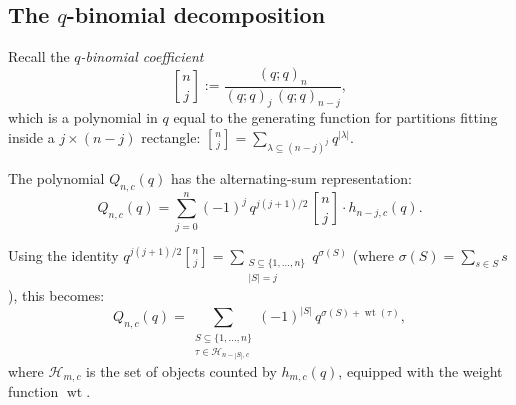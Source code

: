 \documentclass[11pt]{article}
\newcommand{\qpochn}[3]{(#1;#2)_{#3}}
\newcommand{\qbin}[2]{\genfrac{[}{]}{0pt}{}{#1}{#2}}
\theoremstyle{plain}
\theoremstyle{definition}
\begin{document}
\subsection{The $q$-binomial decomposition}

Recall the \emph{$q$-binomial coefficient}
\[
  \qbin{n}{j} := \frac{\qpochn{q}{q}{n}}{\qpochn{q}{q}{j}\,\qpochn{q}{q}{n-j}},
\]
which is a polynomial in $q$ equal to the generating function for
partitions fitting inside a $j \times (n{-}j)$ rectangle:
$\qbin{n}{j} = \sum_{\lambda \subseteq (n-j)^j} q^{|\lambda|}$.

The polynomial $Q_{n,c}(q)$ has the alternating-sum representation:
\begin{equation}\label{eq:Q-alt}
  Q_{n,c}(q)
  = \sum_{j=0}^{n} (-1)^j\, q^{j(j+1)/2}\,
    \qbin{n}{j} \cdot h_{n-j,c}(q).
\end{equation}

Using the identity $q^{j(j+1)/2} \qbin{n}{j} = \sum_{\substack{S
\subseteq \{1,\ldots,n\} \\ |S| = j}} q^{\sigma(S)}$
(where $\sigma(S) = \sum_{s \in S} s$), this becomes:
\begin{equation}\label{eq:Q-ground}
  Q_{n,c}(q)
  = \sum_{\substack{S \subseteq \{1,\ldots,n\} \\
    \tau \in \mathcal{H}_{n-|S|,c}}}
    (-1)^{|S|}\, q^{\sigma(S) + \operatorname{wt}(\tau)},
\end{equation}
where $\mathcal{H}_{m,c}$ is the set of objects counted by $h_{m,c}(q)$,
equipped with the weight function $\operatorname{wt}$.
\end{document}
